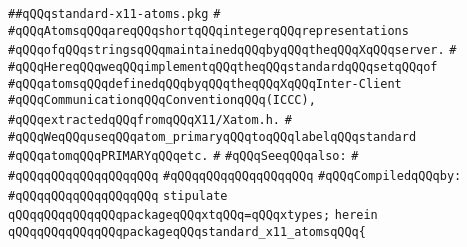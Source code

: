 \label{src/lib/x-kit/xclient/src/iccc/standard-x11-atoms.pkg}
\verb|##qQQqstandard-x11-atoms.pkg|\newline
\verb|#|\newline
\verb|#qQQqAtomsqQQqareqQQqshortqQQqintegerqQQqrepresentations|\newline
\verb|#qQQqofqQQqstringsqQQqmaintainedqQQqbyqQQqtheqQQqXqQQqserver.|\newline
\verb|#|\newline
\verb|#qQQqHereqQQqweqQQqimplementqQQqtheqQQqstandardqQQqsetqQQqof|\newline
\verb|#qQQqatomsqQQqdefinedqQQqbyqQQqtheqQQqXqQQqInter-Client|\newline
\verb|#qQQqCommunicationqQQqConventionqQQq(ICCC),|\newline
\verb|#qQQqextractedqQQqfromqQQqX11/Xatom.h.|\newline
\verb|#|\newline
\verb|#qQQqWeqQQquseqQQqatom_primaryqQQqtoqQQqlabelqQQqstandard|\newline
\verb|#qQQqatomqQQqPRIMARYqQQqetc.|\newline
\verb|#|\newline
\verb|#qQQqSeeqQQqalso:|\newline
\verb|#|\newline
\verb|#qQQqqQQqqQQqqQQqqQQq|\newline
\verb|#qQQqqQQqqQQqqQQqqQQq|\newline
\newline
\verb|#qQQqCompiledqQQqby:|\newline
\verb|#qQQqqQQqqQQqqQQqqQQq|\newline
\newline
\newline
\newline
\newline
\newline
\verb|stipulate|\newline
\verb|qQQqqQQqqQQqqQQqpackageqQQqxtqQQq=qQQqxtypes;|\newline
\verb|herein|\newline
\newline
\verb|qQQqqQQqqQQqqQQqpackageqQQqstandard_x11_atomsqQQq{|\newline
